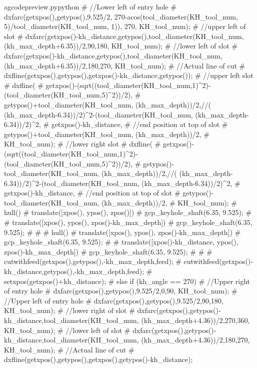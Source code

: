 \documentclass{ltxdoc}
\begin{document}
\begin{writecode}{a}{gcodepreview.py}{python}
{#    //Lower left of entry hole
#    dxfarc(getxpos(),getypos(),9.525/2, 270-acos(tool_diameter(KH_tool_num, 5)/tool_diameter(KH_tool_num, 1)), 270, KH_tool_num);
#    //upper left of slot
#    dxfarc(getxpos()-kh_distance,getypos(),tool_diameter(KH_tool_num, (kh_max_depth+6.35))/2,90,180, KH_tool_num);
#    //lower left of slot
#    dxfarc(getxpos()-kh_distance,getypos(),tool_diameter(KH_tool_num, (kh_max_depth+6.35))/2,180,270, KH_tool_num);
#    //Actual line of cut
#    dxfline(getxpos(),getypos(),getxpos()-kh_distance,getypos());
#    //upper left slot
#    dxfline(
#        getxpos()-(sqrt((tool_diameter(KH_tool_num,1)^2)-(tool_diameter(KH_tool_num,5)^2))/2), 
#        getypos()+tool_diameter(KH_tool_num, (kh_max_depth))/2,//( (kh_max_depth-6.34))/2)^2-(tool_diameter(KH_tool_num, (kh_max_depth-6.34))/2)^2,
#        getxpos()-kh_distance,
#    //end position at top of slot
#        getypos()+tool_diameter(KH_tool_num, (kh_max_depth))/2, 
#        KH_tool_num);
#    //lower right slot
#    dxfline(
#        getxpos()-(sqrt((tool_diameter(KH_tool_num,1)^2)-(tool_diameter(KH_tool_num,5)^2))/2), 
#        getypos()-tool_diameter(KH_tool_num, (kh_max_depth))/2,//( (kh_max_depth-6.34))/2)^2-(tool_diameter(KH_tool_num, (kh_max_depth-6.34))/2)^2,
#        getxpos()-kh_distance,
#    //end position at top of slot
#        getypos()-tool_diameter(KH_tool_num, (kh_max_depth))/2, 
#        KH_tool_num);
#    hull(){
#      translate([xpos(), ypos(), zpos()]){
#        gcp_keyhole_shaft(6.35, 9.525);
#      }
#      translate([xpos(), ypos(), zpos()-kh_max_depth]){
#        gcp_keyhole_shaft(6.35, 9.525);
#      }
#    }
#    hull(){
#      translate([xpos(), ypos(), zpos()-kh_max_depth]){
#        gcp_keyhole_shaft(6.35, 9.525);
#      }
#      translate([xpos()-kh_distance, ypos(), zpos()-kh_max_depth]){
#        gcp_keyhole_shaft(6.35, 9.525);
#      }
#    }
#    cutwithfeed(getxpos(),getypos(),-kh_max_depth,feed);
#    cutwithfeed(getxpos()-kh_distance,getypos(),-kh_max_depth,feed);
#    setxpos(getxpos()+kh_distance);
#  } else if (kh_angle == 270) {
#    //Upper right of entry hole
#    dxfarc(getxpos(),getypos(),9.525/2,0,90, KH_tool_num);
#    //Upper left of entry hole
#    dxfarc(getxpos(),getypos(),9.525/2,90,180, KH_tool_num);
#    //lower right of slot
#    dxfarc(getxpos(),getypos()-kh_distance,tool_diameter(KH_tool_num, (kh_max_depth+4.36))/2,270,360, KH_tool_num);
#    //lower left of slot
#    dxfarc(getxpos(),getypos()-kh_distance,tool_diameter(KH_tool_num, (kh_max_depth+4.36))/2,180,270, KH_tool_num);
#    //Actual line of cut
#    dxfline(getxpos(),getypos(),getxpos(),getypos()-kh_distance);
}
\end{writecode}
\end{document}
